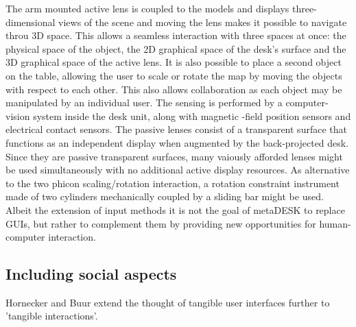 The arm mounted active lens is coupled to the models and displays three-dimensional views of the scene and moving the lens makes it possible to navigate throu 3D space. This allows a seamless interaction with three spaces at once: the physical space of the object, the 2D graphical space of the desk's surface and the 3D graphical space of the active lens.
It is also possible to place a second object on the table, allowing the user to scale or rotate the map by moving the objects with respect to each other. This also allows collaboration as each object may be manipulated by an individual user. The sensing is performed by a computer-vision system inside the desk unit, along with magnetic -field position sensors and electrical contact sensors.
The passive lenses consist of a transparent surface that functions as an independent display when augmented by the back-projected desk. Since they are passive transparent surfaces, many vaiously afforded lenses might be used simultaneously with no additional active display resources.
As alternative to the two phicon scaling/rotation interaction, a rotation constraint instrument made of two cylinders mechanically coupled by a sliding bar might be used.
Albeit the extension of input methods it is not the goal of metaDESK to replace GUIs, but rather to complement them by providing new opportunities for human-computer interaction. 

\subsection{Including social aspects}

Hornecker and Buur \cite{hornecker06} extend the thought of tangible user interfaces further to 'tangible interactions'.


